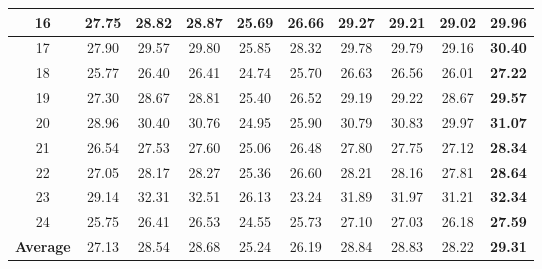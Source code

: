 \documentclass[10pt,twocolumn,letterpaper,sort&compress]{article}
\begin{document}
\begin{table}
\begin{center}
\begin{tabular}{|c||c|c|c|c|c|c|c|c|c|}
\\
\hline
16 & 27.75 & 28.82 & 28.87 & 25.69 & 26.66 & 29.27 & 29.21 & 29.02 & \textbf{29.96}
\\
\hline
17 & 27.90 & 29.57 & 29.80 & 25.85 & 28.32 & 29.78 & 29.79 & 29.16 & \textbf{30.40}
\\
\hline
18 & 25.77 & 26.40 & 26.41 & 24.74 & 25.70 & 26.63 & 26.56 & 26.01 & \textbf{27.22}
\\
\hline
19 & 27.30 & 28.67 & 28.81 & 25.40 & 26.52 & 29.19 & 29.22 & 28.67 & \textbf{29.57}
\\
\hline
20 & 28.96 & 30.40 & 30.76 & 24.95 & 25.90 & 30.79 & 30.83 & 29.97 & \textbf{31.07}
\\
\hline
21 & 26.54 & 27.53 & 27.60 & 25.06 & 26.48 & 27.80 & 27.75 & 27.12 & \textbf{28.34}
\\
\hline
22 & 27.05 & 28.17 & 28.27 & 25.36 & 26.60 & 28.21 & 28.16 & 27.81 & \textbf{28.64}
\\
\hline
23 & 29.14 & 32.31 & 32.51 & 26.13 & 23.24 & 31.89 & 31.97 & 31.21 & \textbf{32.34}
\\
\hline
24 & 25.75 & 26.41 & 26.53 & 24.55 & 25.73 & 27.10 & 27.03 & 26.18 & \textbf{27.59}
\\
\hline
\textbf{Average} & 27.13 & 28.54 & 28.68 & 25.24 & 26.19 & 28.84 & 28.83 & 28.22 & \textbf{29.31}
\\
\hline
\end{tabular}
\end{center}
\vspace{-1mm}
\end{table}
\end{document}

